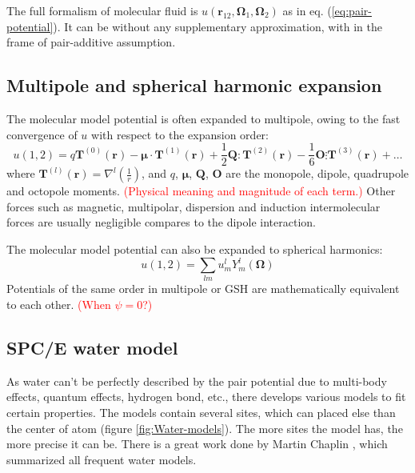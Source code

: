 The full formalism of molecular fluid is $u(\mathbf{r}_{12},\mathbf{\Omega}_{1},\mathbf{\Omega}_{2})$
as in eq. (\ref{eq:pair-potential}). It can be without any supplementary
approximation, with in the frame of pair-additive assumption. 


\subsection{Multipole and spherical harmonic expansion}

The molecular model potential is often expanded to multipole, owing
to the fast convergence of $u$ with respect to the expansion order:
\begin{equation}
u(1,2)=q\mathbf{T}^{(0)}(\mathbf{r})-\boldsymbol{\mu}\cdotp\mathbf{T}^{(1)}(\mathbf{r})+\dfrac{1}{2}\mathbf{Q}\colon\mathbf{T}^{(2)}(\mathbf{r})-\dfrac{1}{6}\mathbf{O}\vdots\mathbf{T}^{(3)}(\mathbf{r})+\ldots
\end{equation}
where $\mathbf{T}^{(l)}(\mathbf{r})=\nabla^{l}\left(\frac{1}{r}\right)$,
and $q$, $\boldsymbol{\mu}$, $\mathbf{Q}$, $\mathbf{O}$ are the
monopole, dipole, quadrupole and octopole moments. \textcolor{red}{(Physical
meaning and magnitude of each term.)} Other forces such as magnetic,
multipolar, dispersion and induction intermolecular forces are usually
negligible compares to the dipole interaction.

The molecular model potential can also be expanded to spherical harmonics:
\begin{equation}
u(1,2)=\sum_{lm}u_{m}^{l}Y_{m}^{l}(\mathbf{\Omega})
\end{equation}
 Potentials of the same order in multipole or \acs{GSH} are mathematically
equivalent to each other. \textcolor{red}{(When $\psi=0$?)}


\subsection{SPC/E water model}

As water can't be perfectly described by the pair potential due to
multi-body effects, quantum effects, hydrogen bond, etc., there develops
various models to fit certain properties. The models contain several
sites, which can placed else than the center of atom (figure \ref{fig:Water-models}).
The more sites the model has, the more precise it can be. There is
a great work done by Martin Chaplin \citep{water-model}, which summarized
all frequent water models. 

